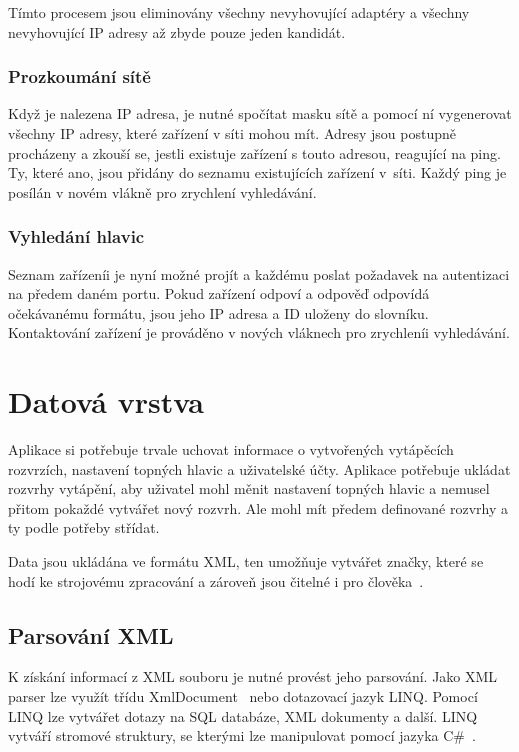 \documentclass[thesis=B,czech]{FITthesis}[2012/10/20]
\begin{document}
Tímto procesem jsou eliminovány všechny nevyhovující adaptéry a všechny nevyhovující IP adresy až zbyde pouze jeden kandidát.

\subsubsection{Prozkoumání sítě}

Když je nalezena IP adresa, je nutné spočítat masku sítě a pomocí ní vygenerovat všechny IP adresy, které zařízení v síti mohou mít. Adresy jsou postupně procházeny a zkouší se, jestli existuje zařízení s touto adresou, reagující na ping. Ty, které ano, jsou přidány do seznamu existujících zařízení v~síti. Každý ping je posílán v novém vlákně pro zrychlení vyhledávání.

\subsubsection{Vyhledání hlavic}

Seznam zařízeníi je nyní možné projít a každému poslat požadavek na autentizaci na předem daném portu. Pokud zařízení odpoví a odpověď odpovídá očekávanému formátu, jsou jeho IP adresa a ID uloženy do slovníku. Kontaktování zařízení je prováděno v nových vláknech pro zrychleníi vyhledávání.

\section{Datová vrstva}

Aplikace si potřebuje trvale uchovat informace o vytvořených vytápěcích rozvrzích, nastavení topných hlavic a uživatelské účty. Aplikace potřebuje ukládat rozvrhy vytápění, aby uživatel mohl měnit nastavení topných hlavic a nemusel přitom pokaždé vytvářet nový rozvrh. Ale mohl mít předem definované rozvrhy a ty podle potřeby střídat.

Data jsou ukládána ve formátu XML, ten umožňuje vytvářet značky, které se hodí ke strojovému zpracování a zároveň jsou čitelné i pro člověka~\cite{xml}.

\subsection{Parsování XML}

K získání informací z XML souboru je nutné provést jeho parsování. Jako XML parser lze využít třídu XmlDocument~\cite{xmlDoc} nebo dotazovací jazyk LINQ. Pomocí LINQ lze vytvářet dotazy na SQL databáze, XML dokumenty a další. LINQ vytváří stromové struktury, se kterými lze manipulovat pomocí jazyka C\#~\cite{linqGuide}. 
\end{document}

